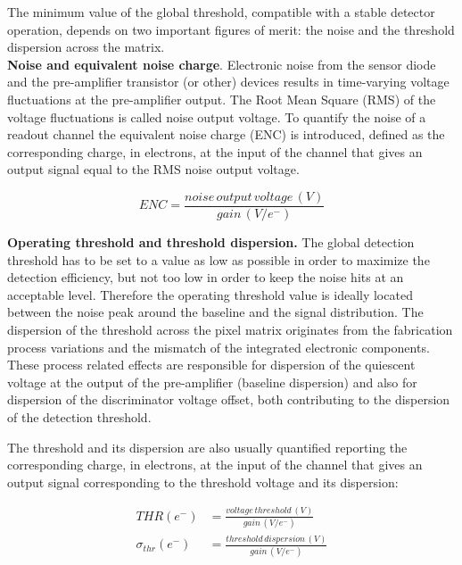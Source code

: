 The minimum value of the global threshold, compatible with a stable detector operation, depends on two important figures of merit: the noise and the threshold dispersion across the matrix. \\

\textbf{Noise and equivalent noise charge}. Electronic noise from the sensor diode and the pre-amplifier transistor (or other) devices results in time-varying voltage fluctuations at the pre-amplifier output. The Root Mean Square (RMS) of the voltage fluctuations is called noise output voltage.  
To quantify the noise of a readout channel the equivalent noise charge (ENC) is introduced, defined as the corresponding charge, in electrons, at the input of the channel that gives an output signal equal to the RMS noise output voltage.

\begin{equation}
ENC = \frac{noise \, output \, voltage \, (V)}{gain \, (V/e^{-})} 
\label{eq:ENC}
\end{equation}

\bigskip

\textbf{Operating threshold and threshold dispersion.} 
The global detection threshold has to be set to a value as low as possible in order to maximize the detection efficiency, but not too low in order to keep the noise hits at an acceptable level. Therefore the operating threshold value is ideally located between the noise peak around the baseline and the signal distribution. 
The dispersion of the threshold across the pixel matrix originates from the fabrication process variations and the mismatch of the integrated electronic components. These process related effects are responsible for dispersion of the quiescent voltage at the output of the pre-amplifier (baseline dispersion) and also for dispersion of the discriminator voltage offset, both contributing to the dispersion of the detection threshold. 

The threshold and its dispersion are also usually quantified reporting the corresponding charge, in electrons, at the input of the channel that gives an output signal corresponding to the threshold voltage and its dispersion:

\begin{align}
THR (e^{-}) & = \frac{voltage \, threshold \, (V)}{gain \, (V/e^{-})} \label{eq:th_gain} \\[2ex]
\sigma_{thr} (e^{-})    & = \frac{threshold \, dispersion \, (V)}{gain \, (V/e^{-})} 
\label{eq:disp_gain}
\end{align}

